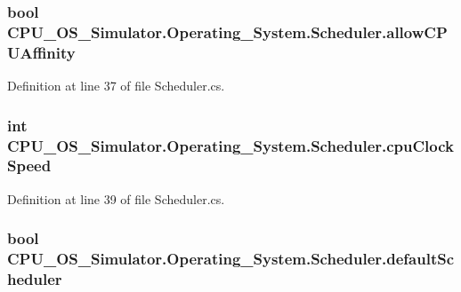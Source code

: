 \subsubsection[{allow\+C\+P\+U\+Affinity}]{\setlength{\rightskip}{0pt plus 5cm}bool C\+P\+U\+\_\+\+O\+S\+\_\+\+Simulator.\+Operating\+\_\+\+System.\+Scheduler.\+allow\+C\+P\+U\+Affinity\hspace{0.3cm}{\ttfamily [private]}}\label{class_c_p_u___o_s___simulator_1_1_operating___system_1_1_scheduler_a732d4b0d95cad3e280f9b69dd4f9f7c4}


Definition at line 37 of file Scheduler.\+cs.

\hypertarget{class_c_p_u___o_s___simulator_1_1_operating___system_1_1_scheduler_ae1829f5340f76cad2150c9e1f9ab3c69}{}
\subsubsection[{cpu\+Clock\+Speed}]{\setlength{\rightskip}{0pt plus 5cm}int C\+P\+U\+\_\+\+O\+S\+\_\+\+Simulator.\+Operating\+\_\+\+System.\+Scheduler.\+cpu\+Clock\+Speed\hspace{0.3cm}{\ttfamily [private]}}\label{class_c_p_u___o_s___simulator_1_1_operating___system_1_1_scheduler_ae1829f5340f76cad2150c9e1f9ab3c69}


Definition at line 39 of file Scheduler.\+cs.

\hypertarget{class_c_p_u___o_s___simulator_1_1_operating___system_1_1_scheduler_afe8019eea4f52f2bd30c40c0ae576eac}{}
\subsubsection[{default\+Scheduler}]{\setlength{\rightskip}{0pt plus 5cm}bool C\+P\+U\+\_\+\+O\+S\+\_\+\+Simulator.\+Operating\+\_\+\+System.\+Scheduler.\+default\+Scheduler\hspace{0.3cm}{\ttfamily [private]}}\label{class_c_p_u___o_s___simulator_1_1_operating___system_1_1_scheduler_afe8019eea4f52f2bd30c40c0ae576eac}


